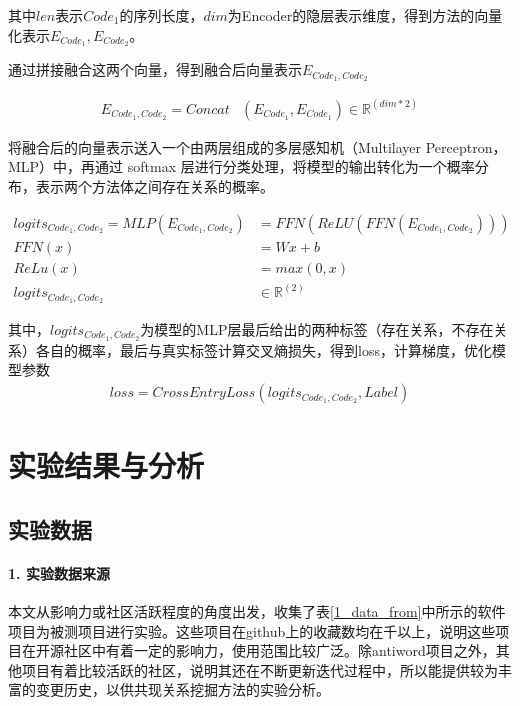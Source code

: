 其中$len$表示$Code_1$的序列长度，$dim$为Encoder的隐层表示维度，得到方法的向量化表示$ E_{Code_1}, E_{Code_2}$。

通过拼接融合这两个向量，得到融合后向量表示$E_{Code_1,Code_2}$

\begin{align}
E_{Code_1,Code_2}=Concat& (E_{Code_1},E_{Code_1})\in \mathbb{R}^{(dim*2)} 
\end{align}

将融合后的向量表示送入一个由两层组成的多层感知机（Multilayer Perceptron，MLP）中，再通过 softmax 层进行分类处理，将模型的输出转化为一个概率分布，表示两个方法体之间存在关系的概率。

\begin{align}
logits_{Code_1,Code_2}=MLP(E_{Code_1,Code_2})&=FFN(ReLU(FFN(E_{Code_1,Code_2}))) \\
FFN(x)&=Wx+b\\
ReLu(x)&=max(0,x)\\
logits_{Code_1,Code_2}& \in \mathbb{R}^{(2)}
\end{align}

其中，$logits_{Code_1,Code_2}$为模型的MLP层最后给出的两种标签（存在关系，不存在关系）各自的概率，最后与真实标签计算交叉熵损失，得到loss，计算梯度，优化模型参数
\begin{align}
loss=CrossEntryLoss(logits_{Code_1,Code_2}, Label)
\end{align}


\section{实验结果与分析}

\subsection{实验数据}

\paragraph{1. 实验数据来源}

本文从影响力或社区活跃程度的角度出发，收集了表\ref{1_data_from}中所示的软件项目为被测项目进行实验。这些项目在github上的收藏数均在千以上，说明这些项目在开源社区中有着一定的影响力，使用范围比较广泛。除antiword项目之外，其他项目有着比较活跃的社区，说明其还在不断更新迭代过程中，所以能提供较为丰富的变更历史，以供共现关系挖掘方法的实验分析。

